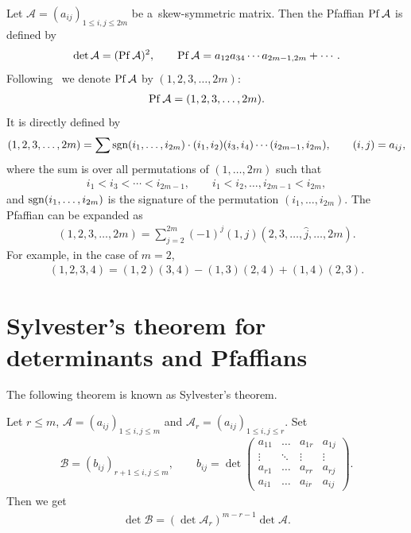 \documentclass[pdftex]{sigma}
\begin{document}
Let ${\mathcal A} =(a_{ij})_{1\le i,j\le2m}$ be a~skew-symmetric matrix.
Then the Pfaf\/f\/ian ${\rm Pf}\, {\mathcal A}$ is def\/ined by
\begin{gather*}
\det{\mathcal A}=({\rm Pf}\,{\mathcal A})^2,\qquad {\rm Pf}\,{\mathcal A}=a_{12}a_{34}\cdots a_{2m-1,2m}+\cdots.
\end{gather*}
Following~\cite{H1} we denote ${\rm Pf}\, {\mathcal A}$ by $(1,2,3,\dots,2m)$:
\begin{gather*}
{\rm Pf}\,{\mathcal A}=(1,2,3,\dots,2m).
\end{gather*}
It is directly def\/ined by
\begin{gather*}
(1,2,3,\dots,2m)=\sum{\rm sgn}(i_1,\dots,i_{2m})\cdot(i_1,i_2)(i_3,i_4)\cdots(i_{2m-1},i_{2m}
),\qquad (i,j)=a_{ij},
\end{gather*}
where the sum is over all permutations of $(1,\dots,2m)$ such that
\begin{gather*}
i_1<i_3<\cdots<i_{2m-1},\qquad i_1<i_2,\dots,i_{2m-1}<i_{2m},
\end{gather*}
and ${\rm sgn}(i_1,\dots,i_{2m})$ is the signature of the permutation $(i_1,\dots,i_{2m})$.
The Pfaf\/f\/ian can be expanded as
\begin{gather*}
(1,2,3,\dots,2m)=\sum_{j=2}^{2m}(-1)^j(1,j)(2,3,\dots,\hat{j},\dots,2m).
\end{gather*}
For example, in the case of $m=2$,
\begin{gather*}
(1,2,3,4)=(1,2)(3,4)-(1,3)(2,4)+(1,4)(2,3).
\end{gather*}

\section{Sylvester's theorem for determinants and Pfaf\/f\/ians} \label{appendixB}

The following theorem is known as
Sylvester's theorem.
\begin{theorem}\label{theorem4}
Let $r\le m$, ${\mathcal A}=(a_{ij})_{1\le i,j\le m}$ and ${\mathcal A}_r=(a_{ij})_{1\le i,j\le r}$.
Set
\begin{gather*}
{\mathcal B}=(b_{ij})_{r+1\le i,j\le m},
\qquad
b_{ij}=\det\left(
\begin{matrix}a_{11}&\hdots&a_{1r}&a_{1j}
\\
\vdots&\ddots&\vdots&\vdots
\\
a_{r1}&\hdots&a_{rr}&a_{rj}
\\
a_{i1}&\hdots&a_{ir}&a_{ij}
\end{matrix}
\right).
\end{gather*}
Then we get
\begin{gather*}%
\det{\mathcal B}=(\det{\mathcal A}_r)^{m-r-1}\det{\mathcal A}.
\end{gather*}
\end{theorem}
\end{document}
